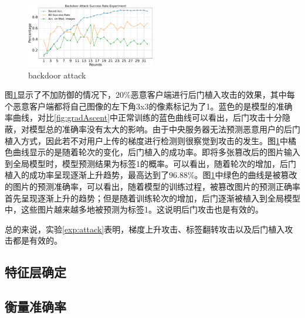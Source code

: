 \documentclass[conference]{IEEEtran}
\def\figBackdoorAttack{0.5\textwidth}
\begin{document}
\begin{figure}[htbp]
    \centerline{\includegraphics[width=\figBackdoorAttack]{pics/003-backdoorAttack.pdf}}
    \caption{backdoor attack}
    \label{fig:backdoorAttack}
\end{figure}

图\hyperref[fig:backdoorAttack]{\ref{fig:backdoorAttack}}显示了不加防御的情况下，$20\%$恶意客户端进行后门植入攻击的效果，其中每个恶意客户端都将自己图像的左下角3x3的像素标记为了1。蓝色的是模型的准确率曲线，对比\hyperref[fig:gradAscent]{\ref{fig:gradAscent}}中正常训练的蓝色曲线可以看出，后门攻击十分隐蔽，对模型总的准确率没有太大的影响。由于中央服务器无法预测恶意用户的后门植入方式，因此若不对用户上传的梯度进行检测则很察觉到攻击的发生。图\hyperref[fig:backdoorAttack]{\ref{fig:backdoorAttack}}中橘色曲线显示的是随着轮次的变化，后门植入的成功率。即将多张篡改后的图片输入到全局模型时，模型预测结果为标签1的概率。可以看出，随着轮次的增加，后门植入的成功率呈现逐渐上升趋势，最高达到了$96.88\%$。图\hyperref[fig:backdoorAttack]{\ref{fig:backdoorAttack}}中绿色的曲线是被篡改的图片的预测准确率，可以看出，随着模型的训练过程，被篡改图片的预测正确率首先呈现逐渐上升的趋势；但是随着训练轮次的增加，后门逐渐被植入到全局模型中，这些图片越来越多地被预测为标签1。这说明后门攻击也是有效的。

总的来说，实验\hyperref[exp:attack]{\ref{exp:attack}}表明，梯度上升攻击、标签翻转攻击以及后门植入攻击都是有效的。

\subsection{特征层确定}
\label{exp:exp_layer}



\subsection{衡量准确率}
\end{document}

